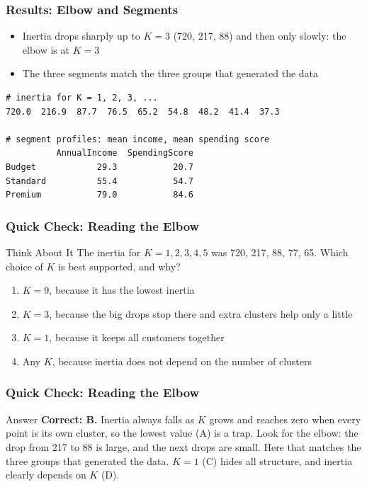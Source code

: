 \begin{frame}[fragile]\frametitle{Results: Elbow and Segments}
\begin{itemize}
\item Inertia drops sharply up to $K = 3$ (720, 217, 88) and then only slowly: the elbow is at $K = 3$
\item The three segments match the three groups that generated the data
\end{itemize}
\begin{lstlisting}
# inertia for K = 1, 2, 3, ...
720.0  216.9  87.7  76.5  65.2  54.8  48.2  41.4  37.3

# segment profiles: mean income, mean spending score
          AnnualIncome  SpendingScore
Budget            29.3           20.7
Standard          55.4           54.7
Premium           79.0           84.6
\end{lstlisting}
\end{frame}

\begin{frame}[fragile]\frametitle{Quick Check: Reading the Elbow}
\begin{block}{Think About It}
The inertia for $K = 1, 2, 3, 4, 5$ was 720, 217, 88, 77, 65. Which choice of $K$ is best supported, and why?
\begin{enumerate}
  \item[A.] $K = 9$, because it has the lowest inertia
  \item[B.] $K = 3$, because the big drops stop there and extra clusters help only a little
  \item[C.] $K = 1$, because it keeps all customers together
  \item[D.] Any $K$, because inertia does not depend on the number of clusters
\end{enumerate}
\end{block}
\end{frame}

\begin{frame}[fragile]\frametitle{Quick Check: Reading the Elbow}
\begin{block}{Answer}
\textbf{Correct: B.} Inertia always falls as $K$ grows and reaches zero when every point is its own cluster, so the lowest value (A) is a trap. Look for the elbow: the drop from 217 to 88 is large, and the next drops are small. Here that matches the three groups that generated the data. $K = 1$ (C) hides all structure, and inertia clearly depends on $K$ (D).
\end{block}
\end{frame}